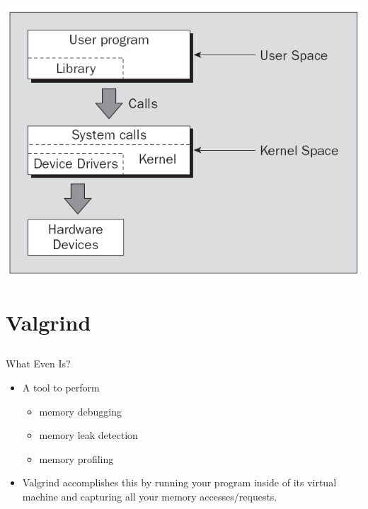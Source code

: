 \documentclass{beamer}
\begin{document}
\begin{frame}{}
\includegraphics[width=1.0\textwidth]{../imgs/sys-arch.png}
\end{frame}

\section{Valgrind}
\subsection{}

\begin{frame}{What Even Is?}
\begin{itemize}
\item A tool to perform
\begin{itemize}
\item memory debugging
\item memory leak detection
\item memory profiling
\end{itemize}
\item Valgrind accomplishes this by running your program inside of its virtual machine and capturing all your memory accesses/requests.
\end{itemize}
\end{frame}
\end{document}
